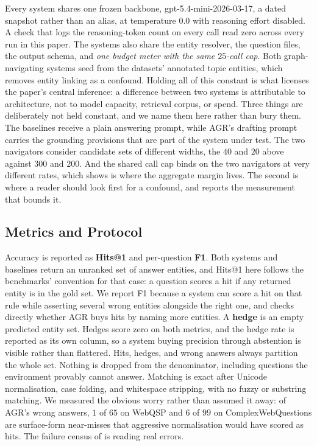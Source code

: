 Every system shares one frozen backbone,
\textsf{gpt-5.4-mini-2026-03-17}, a dated snapshot rather than an alias,
at temperature $0.0$ with reasoning effort disabled. A check that logs
the reasoning-token count on every call read zero across every run in
this paper. The systems also share the entity resolver, the question
files, the output schema, and \emph{one budget meter with the same
$25$-call cap}. Both graph-navigating systems seed from the datasets'
annotated topic entities, which removes entity linking as a confound.
Holding all of this constant is what licenses the paper's central
inference: a difference between two systems is attributable to
architecture, not to model capacity, retrieval corpus, or spend. Three
things are deliberately not held constant, and we name them here rather
than bury them. The baselines receive a plain answering prompt, while
AGR's drafting prompt carries the grounding provisions that are part of
the system under test. The two navigators consider candidate sets of
different widths, the $40$ and $20$ above against $300$ and $200$. And
the shared call cap binds on the two navigators at very different rates,
which  shows is where the aggregate margin lives. The
second is where a reader should look first for a confound, and
 reports the measurement that bounds it.

\subsection{Metrics and Protocol}\label{sec:protocol}

Accuracy is reported as \textbf{Hits@1} and per-question \textbf{F1}.
Both systems and baselines return an unranked set of answer entities,
and Hits@1 here follows the benchmarks' convention for that case: a
question scores a hit if any returned entity is in the gold set. We
report F1 because a system can score a hit on that rule while asserting
several wrong entities alongside the right one, and 
checks directly whether AGR buys hits by naming more entities. A
\textbf{hedge} is an empty predicted entity set. Hedges score zero on
both metrics, and the hedge rate is reported as its own column, so a
system buying precision through abstention is visible rather than
flattered. Hits, hedges, and wrong answers always partition the whole
set. Nothing is dropped from the denominator, including questions the
environment provably cannot answer. Matching is exact after Unicode
normalisation, case folding, and whitespace stripping, with no fuzzy or
substring matching. We measured the obvious worry rather than assumed it
away: of AGR's wrong answers, $1$ of $65$ on WebQSP and $6$ of $99$ on
ComplexWebQuestions are surface-form near-misses that aggressive
normalisation would have scored as hits. The failure census of
 is reading real errors.

